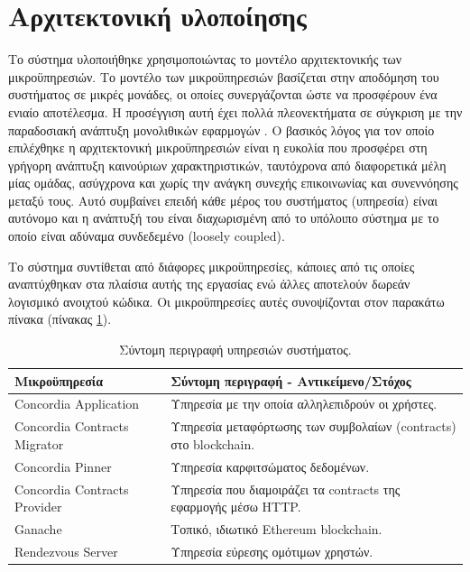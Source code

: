 \section{Αρχιτεκτονική υλοποίησης} \label{section:4-4-implementation-architecture}

Το σύστημα υλοποιήθηκε χρησιμοποιώντας το μοντέλο αρχιτεκτονικής των μικροϋπηρεσιών. Το μοντέλο των μικροϋπηρεσιών βασίζεται στην αποδόμηση του συστήματος σε μικρές μονάδες, οι οποίες συνεργάζονται ώστε να προσφέρουν ένα ενιαίο αποτέλεσμα. Η προσέγγιση αυτή έχει πολλά πλεονεκτήματα σε σύγκριση με την παραδοσιακή ανάπτυξη μονολιθικών εφαρμογών %
. Ο βασικός λόγος για τον οποίο επιλέχθηκε η αρχιτεκτονική μικροϋπηρεσιών είναι η ευκολία που προσφέρει στη γρήγορη ανάπτυξη καινούριων χαρακτηριστικών, ταυτόχρονα από διαφορετικά μέλη μίας ομάδας, ασύγχρονα και χωρίς την ανάγκη συνεχής επικοινωνίας και συνεννόησης μεταξύ τους. Αυτό συμβαίνει επειδή κάθε μέρος του συστήματος (υπηρεσία) είναι αυτόνομο και η ανάπτυξή του είναι διαχωρισμένη από το υπόλοιπο σύστημα με το οποίο είναι αδύναμα συνδεδεμένο (loosely coupled).

Το σύστημα συντίθεται από διάφορες μικροϋπηρεσίες, κάποιες από τις οποίες αναπτύχθηκαν στα πλαίσια αυτής της εργασίας ενώ άλλες αποτελούν δωρεάν λογισμικό ανοιχτού κώδικα. Οι μικροϋπηρεσίες αυτές συνοψίζονται στον παρακάτω πίνακα (πίνακας \ref{table:4-4-microservice-summary}).

\begin{table}[H]
    \begin{center}
        \begin{tabularx}{\textwidth}{l X}
            \toprule
            \textbf{Μικροϋπηρεσία} & \textbf{Σύντομη περιγραφή - Αντικείμενο/Στόχος} \\
            \midrule
            Concordia Application        & Υπηρεσία με την οποία αλληλεπιδρούν οι χρήστες. \\ [0.5ex]
            Concordia Contracts Migrator & Υπηρεσία μεταφόρτωσης των συμβολαίων (contracts) στο blockchain. \\ [0.5ex]
            Concordia Pinner             & Υπηρεσία καρφιτσώματος δεδομένων. \\ [0.5ex]
            Concordia Contracts Provider & Υπηρεσία που διαμοιράζει τα contracts της εφαρμογής μέσω HTTP. \\ [0.5ex]
            Ganache                      & Τοπικό, ιδιωτικό Ethereum blockchain. \\ [0.5ex]
            Rendezvous Server            & Υπηρεσία εύρεσης ομότιμων χρηστών. \\ [0.5ex]
            \bottomrule
        \end{tabularx}
    \end{center}
    \caption{Σύντομη περιγραφή υπηρεσιών συστήματος.}
    \label{table:4-4-microservice-summary}
\end{table}

